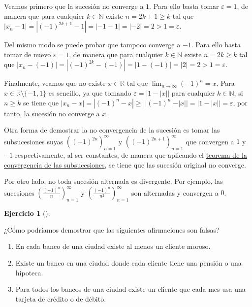 \documentclass[
  spanish,
  a4paper,
]{scrreport}
\providecommand{\tightlist}{%
  \setlength{\itemsep}{0pt}\setlength{\parskip}{0pt}}
\theoremstyle{definition}
\newtheorem{exercise}{Ejercicio}[chapter]
\theoremstyle{remark}
\begin{document}
\begin{tcolorbox}[enhanced jigsaw, arc=.35mm, bottomrule=.15mm, bottomtitle=1mm, breakable, colback=white, colbacktitle=quarto-callout-tip-color!10!white, colframe=quarto-callout-tip-color-frame, coltitle=black, left=2mm, leftrule=.75mm, opacityback=0, opacitybacktitle=0.6, rightrule=.15mm, title=\textcolor{quarto-callout-tip-color}{\faLightbulb}\hspace{0.5em}{Solución}, titlerule=0mm, toprule=.15mm, toptitle=1mm]

Veamos primero que la sucesión no converge a \(1\). Para ello basta
tomar \(\varepsilon=1\), de manera que para cualquier \(k\in\mathbb{N}\)
existe \(n=2k+1\geq k\) tal que
\(|x_n-1|=|(-1)^{2k+1}-1| = |-1-1| = |-2|=2>1=\varepsilon\).

Del mismo modo se puede probar que tampoco converge a \(-1\). Para ello
basta tomar de nuevo \(\varepsilon=1\), de manera que para cualquier
\(k\in\mathbb{N}\) existe \(n=2k\geq k\) tal que
\(|x_n-(-1)|=|(-1)^{2k}-(-1)| = |1-(-1)| = |2|=2>1=\varepsilon\).

Finalmente, veamos que no existe \(x\in\mathbb{R}\) tal que
\(\lim_{n\to\infty}(-1)^n=x\). Para \(x\in\mathbb{R}\setminus\{-1,1\}\)
es sencillo, ya que tomando \(\varepsilon=|1-|x||\) para cualquier
\(k\in\mathbb{N}\), si \(n\geq k\) se tiene que
\(|x_n-x| = |(-1)^n-x| \geq ||(-1)^n|-|x|| = |1 - |x|| =\varepsilon\),
por tanto, la sucesión no converge a \(x\).

Otra forma de demostrar la no convergencia de la sucesión es tomar las
subsucesiones suyas \(\left((-1)^{2n}\right)_{n=1}^\infty\) y
\(\left((-1)^{2n+1}\right)_{n=1}^\infty\) que convergen a \(1\) y \(-1\)
respectivamente, al ser constantes, de manera que aplicando el
\href{https://aprendeconalf.es/analisis-manual/sucesiones.html\#thm-convergencia-subsucesiones}{teorema
de la convergencia de las subsucesiones}, se tiene que las sucesión
original no converge.

Por otro lado, no toda sucesión alternada es divergente. Por ejemplo,
las sucesiones \(\left(\frac{(-1)^n}{n}\right)_{n=1}^\infty\) y
\(\left(\frac{(-1)^n}{n^2}\right)_{n=1}^\infty\) son alternadas y
convergen a \(0\).

\end{tcolorbox}

\begin{exercise}[]\protect\hypertarget{exr-refutacion}{}\label{exr-refutacion}

¿Cómo podríamos demostrar que las siguientes afirmaciones son falsas?

\begin{enumerate}
\def\labelenumi{\alph{enumi}.}
\tightlist
\item
  En cada banco de una ciudad existe al menos un cliente moroso.
\item
  Existe un banco en una ciudad donde cada cliente tiene una pensión o
  una hipoteca.
\item
  Para todos los bancos de una ciudad existe un cliente que cada mes usa
  una tarjeta de crédito o de débito.
\end{enumerate}

\end{exercise}
\end{document}
